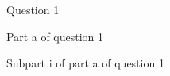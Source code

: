 \documentclass{article}
\begin{document}
    \begin{question}
        Question 1

        \qpart Part a of question 1

        \qsubpart Subpart i of part a of question 1
    \end{question}
\end{document}
